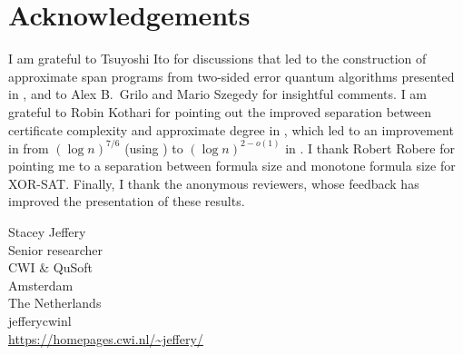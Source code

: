 \documentclass{toc}
\begin{document}
%



%
%


%

%

%
%
%
%
%
%
%
%
%
%
%
%
%
%
%
%
%
%
%
%
%
%
%
%
%
%
%
%
%
%
%
%
%
%
%
%
%
%
%
%
%
%
%
%
%
%
%
%
%
%
%
%
%
%
%
%
%
%
%
%
%
%
%
%
%
%
%
%
%
%
%
%
%
%
%
%
%
%
%
%
%
%
%
%
%
%
%
%
%
%
%
%
%
%
%
%
%
%
%
%
%
%
%
%
%
%
%
%
%

%
%
%
%
%
%
%
%
%
%
%
%
%
%
%
%
%
%
%
%
%
%
%
%
%
%
%
%
%
%
%
%
%
%
%
%
%
%
%
%
%
%
%
%
%
%
%
%
%
%
%
%
%
%
%
%
%
%
%
%
%
%
%
%
%
%
%
%
%
%
%
%
%
%
%
%
%
%
%
%
%
%
%
%
%
%
%
%
%
%
%
%
%
%
%
%
%
%
%
%
%
%
%
%
%
%
%
%
%
%
%
%
%
%
%
%
%
%
%
%
%
%
%
%
%
%
%
%
%
%

%

\section*{Acknowledgements}

I am grateful to Tsuyoshi Ito for discussions that led to the construction of approximate span programs from two-sided error quantum algorithms presented in , and to Alex B.~Grilo and Mario Szegedy for insightful comments. I am grateful to Robin Kothari for pointing out the improved separation between certificate complexity and approximate degree in \cite{BT17}, which led to an improvement in from $(\log n)^{7/6}$ (using \cite{ABK16}) to $(\log n)^{2-o(1)}$ in . 
I thank Robert Robere for pointing me to a separation between formula size and monotone formula size for XOR-SAT. %
Finally, I thank the anonymous reviewers, whose feedback has improved the presentation of these results.


   

%
%
%


%
%
%
%
%
\begin{tocauthors}
\begin{tocinfo}[jeffery]
 Stacey Jeffery\\
 Senior researcher\\
CWI \& QuSoft\\
Amsterdam\\
The Netherlands\\
 jeffery\tocat{}cwi\tocdot{}nl \\   %
 \url{https://homepages.cwi.nl/~jeffery/}      %
\end{tocinfo}
\end{tocauthors}
\end{document}
